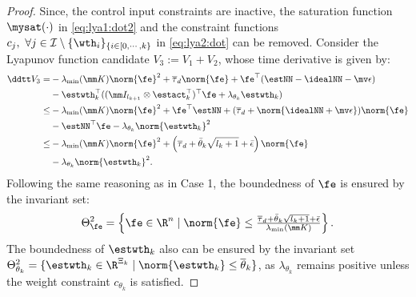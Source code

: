 \documentclass[lettersize,journal]{IEEEtran}
\begin{document}
\begin{proof}
Since, the control input constraints are inactive, the saturation function $\mysat(\cdot)$ in \eqref{eq:lya1:dot2} and the constraint functions $c_j,\ \forall j\in\mathcal I \setminus \{\wth_i\}_{\{i\in[0,\cdots,k\}}$ in \eqref{eq:lya2:dot} can be removed.
Consider the Lyapunov function candidate $V_3:=V_1+V_2$, whose time derivative is given by:
\begin{equation}
    \begin{aligned}
        \ddtt V_3
        =&
        -\lambda_{\min}(\mm K)\norm{\fe}^2
        +\overline\tau_d\norm{\fe}
        +\fe^\top (\estNN - \idealNN - \mv\epsilon)
        \\
        &
        -\estwth_k^\top (
            (\mm I_{l_{k+1}}\otimes \estact_k^\top)^\top
            \fe
            +
            \lambda_{\theta_k}\estwth_k
        )
        \\
        \le&
        -\lambda_{\min}(\mm K)\norm{\fe}^2
        +\fe^\top \estNN
        +(
            \overline\tau_d+\norm{
                \idealNN+\mv\epsilon
            }
        )
        \norm{\fe}
        \\
        &
        -\estNN^\top\fe 
        -\lambda_{\theta_k}\norm{\estwth_k}^2
        \\
        \le&
        -
        \lambda_{\min}(\mm K)
        \norm{\fe}^2
        +
        \left(
            \overline\tau_d
            +
            \bar{\theta}_k\sqrt{l_{k}+1}
            +
            \bar{\epsilon}
        \right)
        \norm{\fe}
        \\
        &
        -
        \lambda_{\theta_k}\norm{\estwth_k}^2
        .
    \end{aligned}
    \label{eq:lya3:dot}
\end{equation}
Following the same reasoning as in Case 1, the boundedness of $\fe$ is ensured by the invariant set:
\begin{equation}
    \Theta_{\fe}^{2}
    =
    \left\{ 
        \fe \in \R^n 
        \mid 
        \norm{\fe} 
        \le 
        \tfrac{
            \overline\tau_d
            +
            \bar{\theta}_k\sqrt{l_{k}+1}
            +
            \bar{\epsilon}
        }{
            \lambda_{\min}(\mm K)
        }
    \right\}
    .
\end{equation}
The boundedness of $\estwth_k$ also can be ensured by the invariant set $\Theta_{\theta_k}^{2}=\{ \estwth_k \in \R^{\Xi_{k}} \mid \norm{\estwth_k} \le \overline\theta_k \}$, as $\lambda_{\theta_k}$ remains positive unless the weight constraint $c_{\theta_k}$ is satisfied.


\end{proof}
\end{document}

